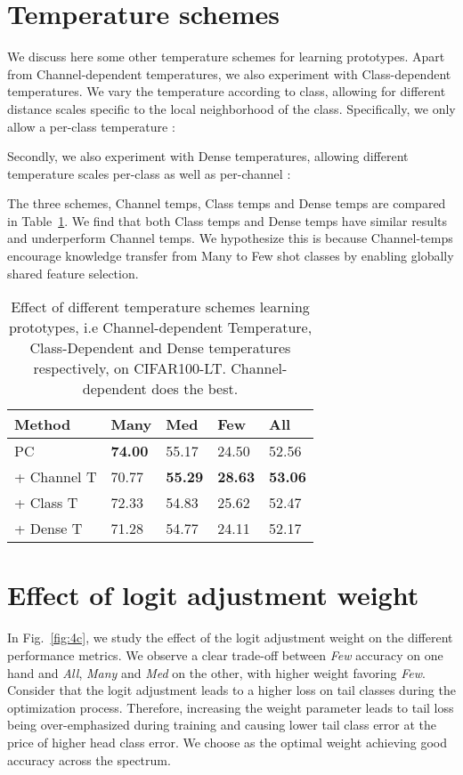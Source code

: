 \documentclass{article}
\begin{document}
\section{Temperature schemes}
We discuss here some other temperature schemes for learning prototypes. Apart from Channel-dependent temperatures, we also experiment with Class-dependent temperatures. We vary the temperature according to class, allowing for different distance scales specific to the local neighborhood of the class. Specifically, we only allow a per-class temperature :

Secondly, we also experiment with Dense temperatures, allowing different temperature scales per-class as well as per-channel :

The three schemes, Channel temps, Class temps and Dense temps are compared in Table~\ref{tab:table 8}. We find that both Class temps and Dense temps have similar results and underperform Channel temps. We hypothesize this is because Channel-temps encourage knowledge transfer from Many to Few shot classes by enabling globally shared feature selection.

\begin{table}[ht]
    \centering
\begin{tabular}{l | l l l l }
    \toprule
    Method & Many & Med & Few & All \\
    \midrule
    PC & \textbf{74.00} & 55.17 & 24.50 & 52.56 \\
     + Channel T  & 70.77 & \textbf{55.29} & \textbf{28.63} & \textbf{53.06} \\
     + Class T  & 72.33 & 54.83 & 25.62 & 52.47 \\
     + Dense T  & 71.28 & 54.77 & 24.11 & 52.17 \\
    \bottomrule
    \end{tabular}
    \caption{Effect of different temperature schemes learning prototypes, i.e Channel-dependent Temperature, Class-Dependent and Dense temperatures respectively, on CIFAR100-LT. Channel-dependent does the best.}
    \label{tab:table 8}
\end{table}

\section{Effect of logit adjustment weight}
In Fig.~\ref{fig:4c}, we study the effect of the logit adjustment weight on the different performance metrics. We observe a clear trade-off between \textit{Few} accuracy on one hand and \textit{All}, \textit{Many} and \textit{Med} on the other, with higher weight favoring \textit{Few}. Consider that the logit adjustment  leads to a higher loss on tail classes during the optimization process. Therefore, increasing the weight parameter leads to tail loss being over-emphasized during training and causing lower tail class error at the price of higher head class error. We choose  as the optimal weight achieving good accuracy across the spectrum.
\end{document}
